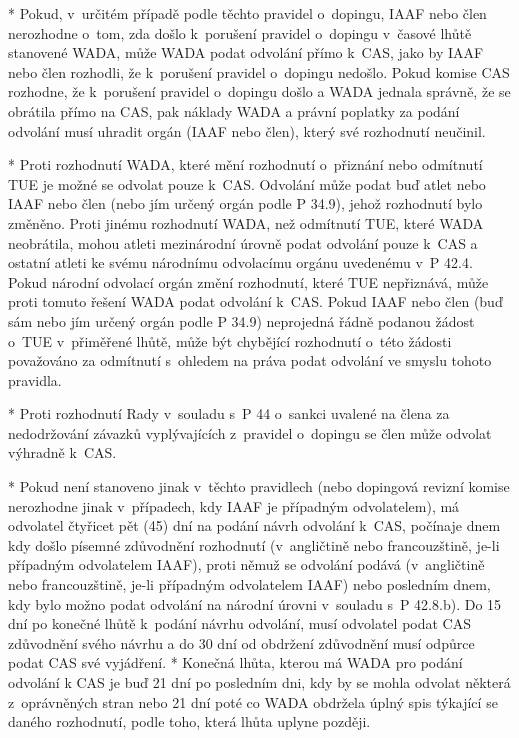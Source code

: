 * Pokud, v~určitém případě podle těchto pravidel o~dopingu, IAAF nebo člen nerozhodne o~tom, zda došlo k~porušení pravidel o~dopingu v~časové lhůtě stanovené WADA, může WADA podat odvolání přímo k~CAS, jako by IAAF nebo člen rozhodli, že k~porušení pravidel o~dopingu  nedošlo.  Pokud komise CAS rozhodne, že k~porušení pravidel o~dopingu došlo a WADA jednala správně, že se obrátila přímo na CAS, pak náklady WADA a právní poplatky za podání odvolání musí uhradit orgán (IAAF nebo člen), který své rozhodnutí neučinil.

* Proti rozhodnutí WADA, které mění rozhodnutí o~přiznání nebo odmítnutí TUE je možné se odvolat pouze k~CAS. Odvolání může podat buď atlet nebo IAAF nebo člen (nebo jím určený orgán podle P 34.9), jehož rozhodnutí bylo změněno. Proti jinému rozhodnutí WADA, než odmítnutí TUE, které WADA neobrátila, mohou atleti mezinárodní úrovně podat odvolání pouze k~CAS a ostatní atleti ke svému národnímu odvolacímu orgánu uvedenému v~P 42.4. Pokud národní odvolací orgán změní rozhodnutí, které TUE nepřiznává, může proti tomuto řešení WADA podat odvolání k~CAS. Pokud IAAF nebo člen (buď sám nebo jím určený orgán podle P 34.9) neprojedná řádně podanou žádost o~TUE v~přiměřené lhůtě, může být chybějící rozhodnutí o~této žádosti považováno za odmítnutí s~ohledem na práva podat odvolání ve smyslu tohoto pravidla.

* Proti rozhodnutí Rady v~souladu s~P 44 o~sankci uvalené na člena za nedodržování závazků vyplývajících z~pravidel o~dopingu se člen může odvolat výhradně k~CAS.

* Pokud není stanoveno jinak v~těchto pravidlech (nebo dopingová revizní komise nerozhodne jinak v~případech, kdy IAAF je případným odvolatelem), má odvolatel čtyřicet pět (45) dní na podání návrh odvolání k~CAS, počínaje dnem kdy došlo písemné zdůvodnění rozhodnutí (v~angličtině nebo francouzštině, je-li  případným odvolatelem IAAF), proti němuž se odvolání podává (v~angličtině nebo francouzštině, je-li  případným odvolatelem IAAF) nebo  posledním dnem, kdy bylo možno podat odvolání na národní úrovni v~souladu s~P 42.8.b). Do 15 dní po konečné lhůtě k~podání návrhu odvolání, musí odvolatel podat CAS zdůvodnění svého návrhu a do 30 dní od obdržení zdůvodnění musí odpůrce podat CAS své vyjádření.
* Konečná lhůta, kterou má WADA pro podání odvolání k CAS je buď 21 dní po posledním dni, kdy by se mohla odvolat některá z~oprávněných stran nebo 21 dní poté co WADA obdržela úplný spis týkající se daného rozhodnutí, podle toho, která lhůta uplyne později.

